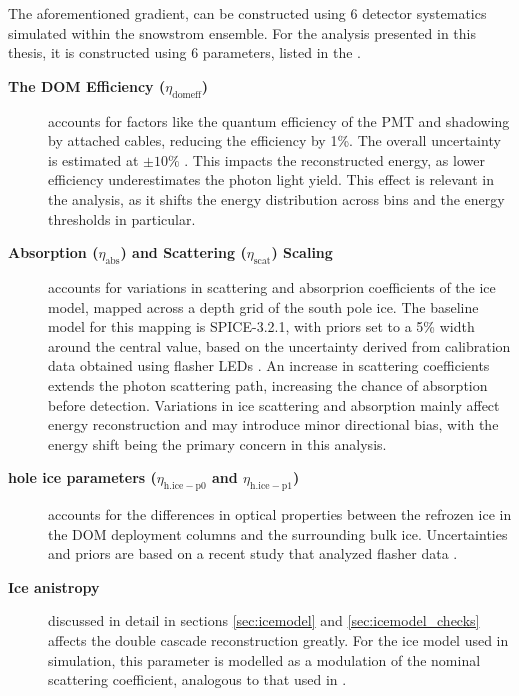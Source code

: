 The aforementioned gradient, can be constructed using 6 detector systematics simulated within the snowstrom ensemble. For the analysis presented in this thesis, it is constructed using 6 parameters, listed in the . 
\begin{description}
    \item [\textbf{The DOM Efficiency ($\eta_{\mathrm{domeff}}$)}] accounts for factors like the quantum efficiency of the PMT and shadowing by attached cables, reducing the efficiency by 1\%. The overall uncertainty is estimated at $\pm10\%$ . This impacts the reconstructed energy, as lower efficiency underestimates the photon light yield. This effect is relevant in the analysis, as it shifts the energy distribution across bins and the energy thresholds in particular.
    \item [\textbf{Absorption ($\eta_{\mathrm{abs}}$) and Scattering ($\eta_{\mathrm{scat}}$) Scaling}] accounts for variations in scattering and absorprion coefficients of the ice model, mapped across a depth grid of the south pole ice. The baseline model for this mapping is SPICE-3.2.1, with priors set to a 5\% width around the central value, based on the uncertainty derived from calibration data obtained using flasher LEDs \cite{spicemie}. An increase in scattering coefficients extends the photon scattering path, increasing the chance of absorption before detection. Variations in ice scattering and absorption mainly affect energy reconstruction and may introduce minor directional bias, with the energy shift being the primary concern in this analysis.  
    \item [\textbf{hole ice parameters ($\eta_{\mathrm{h.ice-p0}}$ and $\eta_{\mathrm{h.ice-p1}}$)}] accounts for the differences in optical properties between the refrozen ice in the DOM deployment columns and the surrounding bulk ice. Uncertainties and priors are based on a recent study that analyzed flasher data .
    \item [\textbf{Ice anistropy}] discussed in detail in sections \ref{sec:icemodel} and \ref{sec:icemodel_checks} affects the double cascade reconstruction greatly. For the ice model used in simulation, this parameter is modelled as a modulation of the nominal scattering coefficient, analogous to that used in .
\end{description}




